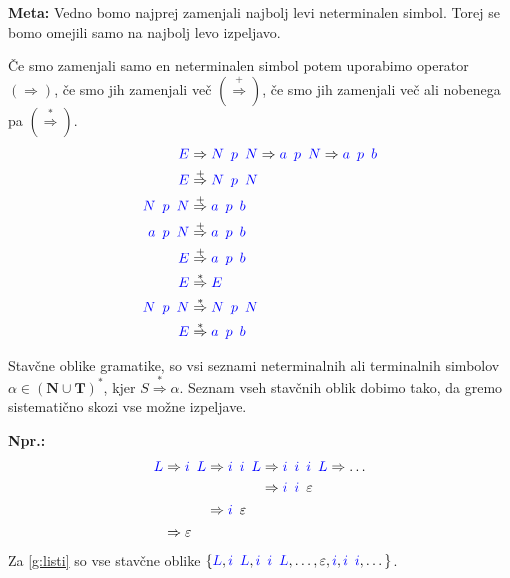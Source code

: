 \documentclass{article}
\newcommand{\Ex}{\textbf{Npr.:}\ }
\newcommand{\Special}[1]{\textbf{#1}}
\newcommand{\Set}[1]{\mathbf{#1}}
\newcommand{\Symbol}[1]{\textcolor{blue}{#1}}
\newcommand{\Terminals}{\Set{T}}
\newcommand{\NonTerminals}{\Set{N}}
\newcommand{\StartSymbol}{S}
\newcommand{\Null}{\varepsilon}
\newcommand{\Derive}{\Rightarrow}
\newcommand{\DeriveStar}{\overset{\ast}{\Rightarrow}}
\newcommand{\DerivePlus}{\overset{+}{\Rightarrow}}
\newcommand{\Seq}{{\ \,}}
\newcommand{\Kleene}[1]{#1^\ast}
\begin{document}
\Special{Meta:} Vedno bomo najprej zamenjali najbolj levi neterminalen simbol. Torej se bomo omejili samo na najbolj levo izpeljavo.

Če smo zamenjali samo en neterminalen simbol potem uporabimo operator $(\Derive)$, če smo jih zamenjali več $(\DerivePlus)$, če smo jih zamenjali več ali nobenega pa $(\DeriveStar)$.
  \begin{align*}
    \Symbol{E} &\Derive \Symbol{N} \Seq \Symbol{p} \Seq \Symbol{N} \Derive \Symbol{a} \Seq \Symbol{p} \Seq \Symbol{N} \Derive \Symbol{a} \Seq \Symbol{p} \Seq \Symbol{b} \\
    \Symbol{E} &\DerivePlus \Symbol{N} \Seq \Symbol{p} \Seq \Symbol{N}\\
    \Symbol{N} \Seq \Symbol{p} \Seq \Symbol{N} &\DerivePlus \Symbol{a} \Seq \Symbol{p} \Seq \Symbol{b}\\
    \Symbol{a} \Seq \Symbol{p} \Seq \Symbol{N} &\DerivePlus \Symbol{a} \Seq \Symbol{p} \Seq \Symbol{b}\\
    \Symbol{E} &\DerivePlus \Symbol{a} \Seq \Symbol{p} \Seq \Symbol{b}\\
    \Symbol{E} &\DeriveStar \Symbol{E}\\
    \Symbol{N} \Seq \Symbol{p} \Seq \Symbol{N} &\DeriveStar \Symbol{N} \Seq \Symbol{p} \Seq \Symbol{N}\\
    \Symbol{E} &\DeriveStar \Symbol{a} \Seq \Symbol{p} \Seq \Symbol{b}
  \end{align*}

Stavčne oblike gramatike, so vsi seznami neterminalnih ali terminalnih simbolov $\alpha \in \Kleene{(\NonTerminals \cup \Terminals)}$, kjer $\StartSymbol \DeriveStar \alpha$.
Seznam vseh stavčnih oblik dobimo tako, da gremo sistematično skozi vse možne izpeljave.

\Ex
  \begin{equation*}
    \Symbol{L} \begin{aligned}[t]
      &\Derive \Symbol{i} \Seq \Symbol{L} \begin{aligned}[t]
        &\Derive \Symbol{i} \Seq \Symbol{i} \Seq \Symbol{L} \begin{aligned}[t]
          &\Derive \Symbol{i} \Seq \Symbol{i} \Seq \Symbol{i} \Seq \Symbol{L} \Derive \dots\\
          &\Derive \Symbol{i} \Seq \Symbol{i} \Seq \Null 
        \end{aligned}\\
        &\Derive \Symbol{i} \Seq \Null 
      \end{aligned}\\
      &\Derive \Null
    \end{aligned}
  \end{equation*}
Za \ref{g:listi} so vse stavčne oblike $\{\Symbol{L}, \Symbol{i} \Seq \Symbol{L}, \Symbol{i} \Seq \Symbol{i} \Seq \Symbol{L}, \dots, \Null, \Symbol{i}, \Symbol{i} \Seq \Symbol{i}, \dots\}$.
\end{document}
